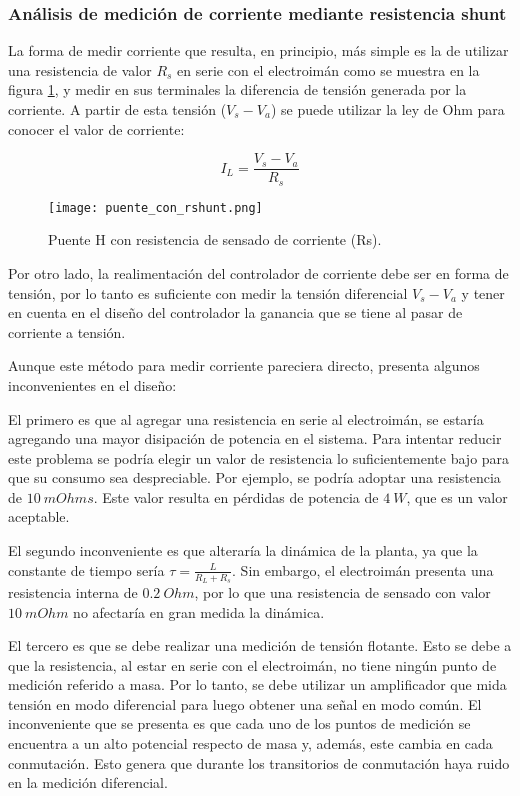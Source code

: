 \subsubsection{Análisis de medición de corriente mediante resistencia shunt}
La forma de medir corriente que resulta, en principio, más simple es la de utilizar una resistencia de valor $R_s$ en serie con el electroimán como se muestra en la figura \ref{fig:img_puente_con_rshunt}, y medir en sus terminales la diferencia de tensión generada por la corriente. A partir de esta tensión ($V_s-V_a$) se puede utilizar la ley de Ohm para conocer el valor de corriente:

\begin{equation}
	I_L=\frac{V_s-V_a}{R_s}
\end{equation}


\begin{figure}[H]
	\centering
	\texttt{[image: puente\_con\_rshunt.png]}
	\caption{Puente H con resistencia de sensado de corriente (Rs).}
	\label{fig:img_puente_con_rshunt}
\end{figure}

Por otro lado, la realimentación del controlador de corriente debe ser en forma de tensión, por lo tanto es suficiente con medir la tensión diferencial $V_s-V_a$ y tener en cuenta en el diseño del controlador la ganancia que se tiene al pasar de corriente a tensión.

Aunque este método para medir corriente pareciera directo, presenta algunos inconvenientes en el diseño:

El primero es que al agregar una resistencia en serie al electroimán, se estaría agregando una mayor disipación de potencia en el sistema. Para intentar reducir este problema se podría elegir un valor de resistencia lo suficientemente bajo para que su consumo sea despreciable. Por ejemplo, se podría adoptar una resistencia de $10\:mOhms$. Este valor resulta en pérdidas de potencia de $4\:W$, que es un valor aceptable. 

El segundo inconveniente es que alteraría la dinámica de la planta, ya que la constante de tiempo sería $\tau=\frac{L}{R_L+R_s}$. Sin embargo, el electroimán presenta una resistencia interna de $0.2\:Ohm$, por lo que una resistencia de sensado con valor $10\:mOhm$ no afectaría en gran medida la dinámica.

El tercero es que se debe realizar una medición de tensión flotante. Esto se debe a que la resistencia, al estar en serie con el electroimán, no tiene ningún punto de medición referido a masa. Por lo tanto, se debe utilizar un amplificador que mida tensión en modo diferencial para luego obtener una señal en modo común. El inconveniente que se presenta es que cada uno de los puntos de medición se encuentra a un alto potencial respecto de masa y, además, este cambia en cada conmutación. Esto genera que durante los transitorios de conmutación haya ruido en la medición diferencial.

